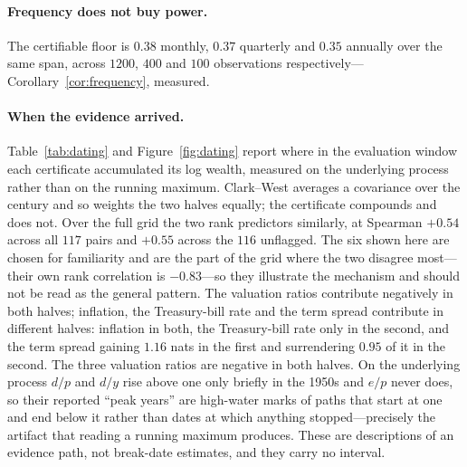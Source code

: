 \documentclass{article}
\theoremstyle{plain}
\theoremstyle{definition}
\begin{document}
\paragraph{Frequency does not buy power.} The certifiable floor is $0.38$ monthly, $0.37$
quarterly and $0.35$ annually over the same span, across $1200$, $400$ and $100$ observations
respectively---Corollary~\ref{cor:frequency}, measured.

\paragraph{When the evidence arrived.} Table~\ref{tab:dating} and Figure~\ref{fig:dating}
report where in the evaluation window each certificate accumulated its log wealth, measured on
the underlying process rather than on the running maximum. Clark--West averages a covariance
over the century and so weights the two halves equally; the certificate compounds and does not.
Over the full grid the two rank predictors similarly, at Spearman $+0.54$ across all $117$ pairs
and $+0.55$ across the $116$ unflagged. The six shown here are chosen for familiarity and are
the part of the grid where the two disagree most---their own rank correlation is $-0.83$---so
they illustrate the mechanism and should not be read as the general pattern. The valuation
ratios contribute negatively in both halves; inflation, the Treasury-bill rate and the term
spread contribute in different halves: inflation in both, the Treasury-bill rate only in the second, and the term
spread gaining $1.16$ nats in the first and surrendering $0.95$ of it in the second. The three
valuation ratios are negative in both halves. On the underlying process $d/p$ and $d/y$ rise
above one only briefly in the 1950s and $e/p$ never does, so their reported ``peak years'' are
high-water marks of paths that start at one and end below it rather than dates at which
anything stopped---precisely the artifact that reading a running maximum produces. These are descriptions of an evidence path, not break-date estimates, and they carry
no interval.
\end{document}
